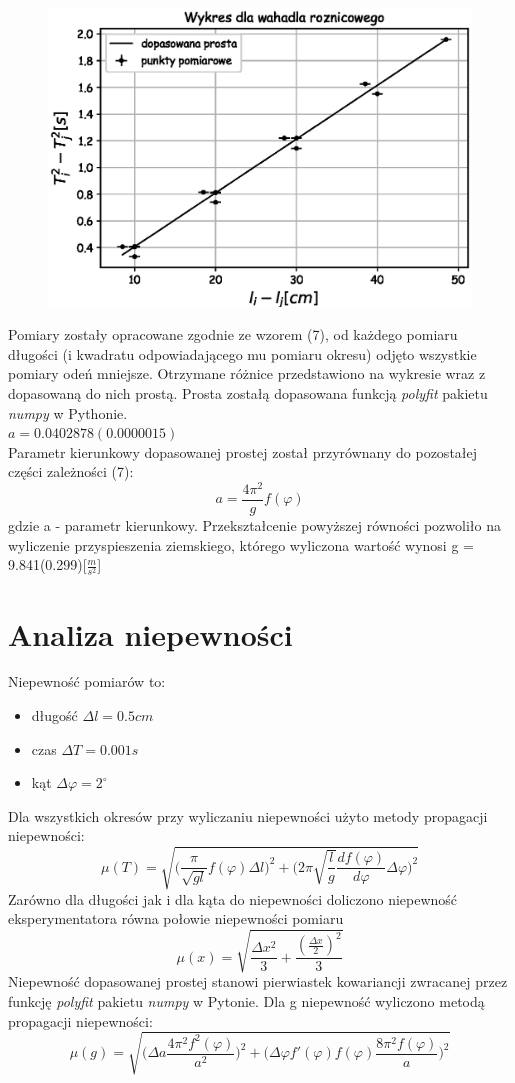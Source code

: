\documentclass[a4paper,10pt]{article}
\begin{document}
\begin{figure}[H]
    \includegraphics{./Wykres_roznicowe.eps}
    \caption{}
    \label{}
\end{figure}
Pomiary zostały opracowane zgodnie ze wzorem (7), od każdego pomiaru długości (i kwadratu odpowiadającego mu pomiaru okresu) odjęto wszystkie pomiary odeń mniejsze. Otrzymane różnice przedstawiono na wykresie wraz z dopasowaną do nich prostą. Prosta zostałą dopasowana funkcją \emph{polyfit} pakietu \emph{numpy} 
w Pythonie.\\
$a = 0.0402878(0.0000015)$
\\ 
Parametr kierunkowy dopasowanej prostej został przyrównany do pozostałej części zależności (7):
\begin{equation}
a = \frac{4 \pi^2}{g} f(\varphi)
\end{equation}
gdzie a - parametr kierunkowy. Przekształcenie powyższej równości pozwoliło na wyliczenie przyspieszenia ziemskiego, którego wyliczona wartość wynosi g = 9.841(0.299)[$\frac{m}{s^2}$]
\section{Analiza niepewności}
Niepewność pomiarów to:
\begin{itemize}
	\item długość $\Delta l = 0.5 cm$
	\item czas $\Delta T = 0.001 s$
	\item kąt $\Delta \varphi = 2 ^\circ$
\end{itemize}
Dla wszystkich okresów przy wyliczaniu niepewności użyto metody propagacji niepewności:
$$\mu(T) = \sqrt{\bigg(\frac{\pi}{\sqrt{gl}}f(\varphi)\Delta l \bigg)^2 + \bigg(2\pi\sqrt{\frac{l}{g}}\frac{df(\varphi)}{d\varphi}\Delta \varphi \bigg)^2}$$
Zarówno dla długości jak i dla kąta do niepewności doliczono niepewność eksperymentatora równa połowie niepewności pomiaru
$$\mu(x) = \sqrt{\frac{\Delta x^2}{3}+\frac{(\frac{\Delta x}{2})^2}{3}}$$
Niepewność dopasowanej prostej stanowi pierwiastek kowariancji zwracanej przez funkcję \emph{polyfit} pakietu \emph{numpy} w Pytonie. Dla g niepewność wyliczono metodą propagacji niepewności:
$$\mu(g) = \sqrt{\bigg(\Delta a \frac{4 \pi^2 f^2(\varphi)}{a^2}\bigg)^2+\bigg(\Delta\varphi f'(\varphi)f(\varphi) \frac{8 \pi^2 f(\varphi)}{a}\bigg)^2}$$
\end{document}
